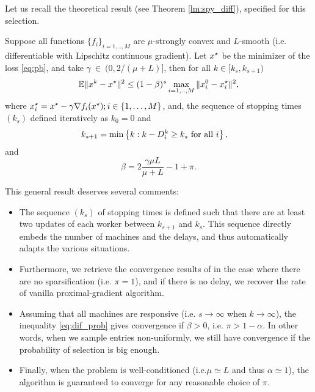 Let us recall the theoretical result (see Theorem \ref{lm:spy_diff}), specified for this selection.
\begin{corollary}\label{cor:spydr_rate}
Suppose all functions $\{f_i\}_{i=1,..,M}$ are $\mu$-strongly convex and $L$-smooth (i.e. differentiable with Lipschitz continuous gradient). Let $x^\star$ be the minimizer of the  loss \eqref{eq:pb}, and take  $\gamma~\in~(0,2/(\mu+L)]$, then for all $k\in[k_s, k_{s+1})$
\begin{equation}
   \mathbb{E}\|x^k - x^\star\|^2 
 \leq  (1-\beta)^s \max_{i=1,..,M} \|x_i^0 - x_i^\star\|^2,
\end{equation}
where $x_i^\star = x^\star - \gamma \nabla f_i(x^\star); i\in\{1,\ldots,M\}$, and, the sequence of stopping times
$(k_s)$ defined iteratively as $k_0 = 0$ and
\begin{align}
\label{eq:km1}
k_{s+1} &= \min\left\{ k : k- D_i^k \geq k_s ~\textnormal{for all $i$} \right\}, 
\end{align}
and 
$$
\beta = 2\frac{\gamma \mu L}{\mu+L} - 1 + \pi.
$$
\end{corollary}
This general result deserves several comments:
\begin{itemize}
    \item The sequence $(k_s)$ of stopping times
 is defined such that there are at least two updates of each worker between $k_{s+1}$ and $k_s$. 
 This sequence directly embeds the number of machines and the delays, and thus automatically adapts the various situations. %
\item Furthermore, we retrieve the convergence results of \cite{mishchenko2018} in the case where there are no sparsification (i.e. $\pi=1$), and if there is no delay, we recover the rate of vanilla proximal-gradient algorithm.
\item Assuming that all machines are responsive (i.e. $s\to \infty$ when $k\to\infty$), the inequality \eqref{eq:dif_prob} gives convergence if $\beta > 0$, i.e. ${\pi} > {1 - \alpha}$. 
In other words, when we sample entries non-uniformly, we still have convergence if the probability of selection is big enough.
\item Finally, when the problem is well-conditioned (i.e.\;$\mu\simeq L$ and thus $\alpha\simeq 1$), the algorithm is guaranteed to converge for any reasonable choice of $\pi$.
\end{itemize}

